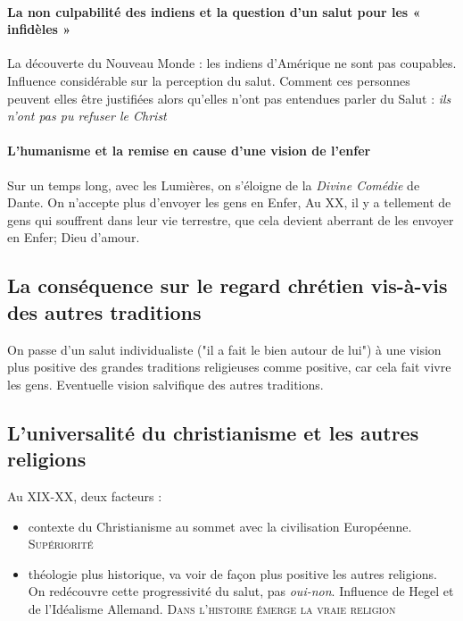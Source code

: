   

     
      
       \paragraph{La non culpabilité des indiens et la question d'un salut pour les
      « infidèles »}
      La découverte du Nouveau Monde : les indiens d'Amérique ne sont pas coupables. Influence considérable sur la perception du salut. Comment ces personnes peuvent elles être justifiées alors qu'elles n'ont pas entendues parler du Salut : \textit{ils n'ont pas pu refuser le Christ}
     
      
       \paragraph{L'humanisme et la remise en cause d'une vision de l'enfer}
      Sur un temps long, avec les Lumières, on s'éloigne de la \textit{Divine Comédie }de Dante. On n'accepte plus d'envoyer les gens en Enfer,  Au XX, il y a tellement de gens qui souffrent dans leur vie terrestre, que cela devient aberrant de les envoyer en Enfer; Dieu d'amour. 
  
   
    
    \subsection{La conséquence sur le regard chrétien vis-à-vis des autres
    traditions}
    
   
    On passe d'un salut individualiste ("il a fait le bien autour de lui") à une vision plus positive des grandes traditions religieuses comme positive, car cela fait vivre les gens. Eventuelle vision salvifique des autres traditions.
    
    
    
    \subsection{L'universalité du christianisme et les autres religions} 
    
    Au XIX-XX, deux facteurs :
    \begin{itemize}
        \item contexte du Christianisme au sommet avec la civilisation Européenne. \textsc{Supériorité}
        \item théologie plus historique, va voir de façon plus positive les autres religions. On redécouvre cette progressivité du salut, pas \textit{oui-non}. Influence de Hegel et de l'Idéalisme Allemand. \textsc{Dans l'histoire émerge la vraie religion}
    \end{itemize}
    
